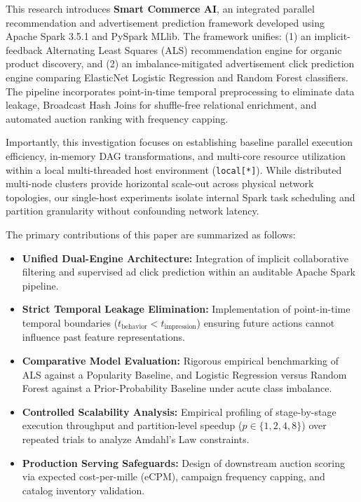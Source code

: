 \documentclass[10pt,a4paper,twoside]{article}
\begin{document}
This research introduces \textbf{Smart Commerce AI}, an integrated parallel recommendation and advertisement prediction framework developed using Apache Spark 3.5.1 and PySpark MLlib. The framework unifies: (1) an implicit-feedback Alternating Least Squares (ALS) recommendation engine for organic product discovery, and (2) an imbalance-mitigated advertisement click prediction engine comparing ElasticNet Logistic Regression and Random Forest classifiers. The pipeline incorporates point-in-time temporal preprocessing to eliminate data leakage, Broadcast Hash Joins for shuffle-free relational enrichment, and automated auction ranking with frequency capping. 

Importantly, this investigation focuses on establishing baseline parallel execution efficiency, in-memory DAG transformations, and multi-core resource utilization within a local multi-threaded host environment (\texttt{local[*]}). While distributed multi-node clusters provide horizontal scale-out across physical network topologies, our single-host experiments isolate internal Spark task scheduling and partition granularity without confounding network latency.

The primary contributions of this paper are summarized as follows:
\begin{itemize}
    \item \textbf{Unified Dual-Engine Architecture:} Integration of implicit collaborative filtering and supervised ad click prediction within an auditable Apache Spark pipeline.
    \item \textbf{Strict Temporal Leakage Elimination:} Implementation of point-in-time temporal boundaries ($t_{\text{behavior}} < t_{\text{impression}}$) ensuring future actions cannot influence past feature representations.
    \item \textbf{Comparative Model Evaluation:} Rigorous empirical benchmarking of ALS against a Popularity Baseline, and Logistic Regression versus Random Forest against a Prior-Probability Baseline under acute class imbalance.
    \item \textbf{Controlled Scalability Analysis:} Empirical profiling of stage-by-stage execution throughput and partition-level speedup ($p \in \{1, 2, 4, 8\}$) over repeated trials to analyze Amdahl's Law constraints.
    \item \textbf{Production Serving Safeguards:} Design of downstream auction scoring via expected cost-per-mille (eCPM), campaign frequency capping, and catalog inventory validation.
\end{itemize}
\end{document}
